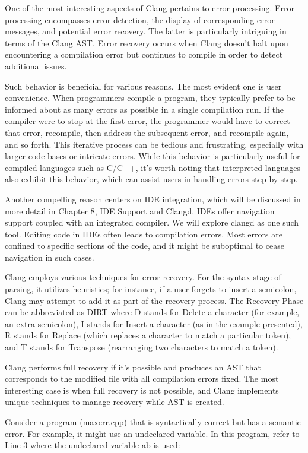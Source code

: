 One of the most interesting aspects of Clang pertains to error processing. Error processing encompasses error detection, the display of corresponding error messages, and potential error recovery. The latter is particularly intriguing in terms of the Clang AST. Error recovery occurs when Clang doesn’t halt upon encountering a compilation error but continues to compile in order to detect additional issues.

Such behavior is beneficial for various reasons. The most evident one is user convenience. When programmers compile a program, they typically prefer to be informed about as many errors as possible in a single compilation run. If the compiler were to stop at the first error, the programmer would have to correct that error, recompile, then address the subsequent error, and recompile again, and so forth. This iterative process can be tedious and frustrating, especially with larger code bases or intricate errors. While this behavior is particularly useful for compiled languages such as C/C++, it’s worth noting that interpreted languages also exhibit this behavior, which can assist users in handling errors step by step.

Another compelling reason centers on IDE integration, which will be discussed in more detail in Chapter 8, IDE Support and Clangd. IDEs offer navigation support coupled with an integrated compiler. We will explore clangd as one such tool. Editing code in IDEs often leads to compilation errors. Most errors are confined to specific sections of the code, and it might be suboptimal to cease navigation in such cases.

Clang employs various techniques for error recovery. For the syntax stage of parsing, it utilizes heuristics; for instance, if a user forgets to insert a semicolon, Clang may attempt to add it as part of the recovery process. The Recovery Phase can be abbreviated as DIRT where D stands for Delete a character (for example, an extra semicolon), I stands for Insert a character (as in the example presented), R stands for Replace (which replaces a character to match a particular token), and T stands for Transpose (rearranging two characters to match a token).

Clang performs full recovery if it’s possible and produces an AST that corresponds to the modified file with all compilation errors fixed. The most interesting case is when full recovery is not possible, and Clang implements unique techniques to manage recovery while AST is created.

Consider a program (maxerr.cpp) that is syntactically correct but has a semantic error. For example, it might use an undeclared variable. In this program, refer to Line 3 where the undeclared variable ab is used:

